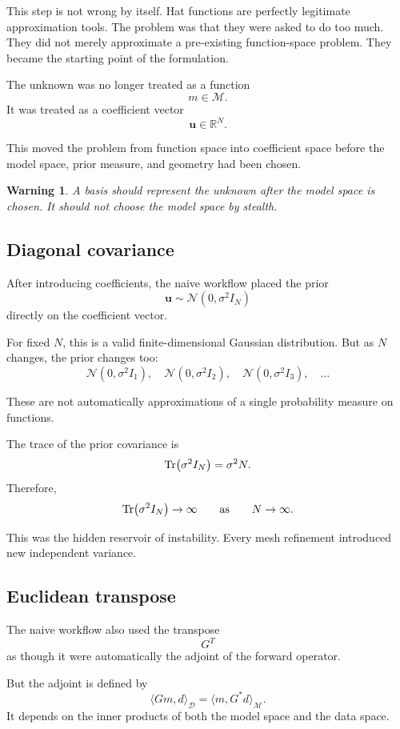 \documentclass[11pt,a4paper]{book}
\newtheorem{warning}[definition]{Warning}
\newcommand{\M}{\mathcal{M}}      %
\newcommand{\D}{\mathcal{D}}      %
\newcommand{\R}{\mathbb{R}}
\newcommand{\G}{G}
\newcommand{\Gadj}{G^\ast}
\begin{document}
This step is not wrong by itself. Hat functions are perfectly legitimate
approximation tools. The problem was that they were asked to do too much. They
did not merely approximate a pre-existing function-space problem. They became
the starting point of the formulation.

The unknown was no longer treated as a function
\[
    m\in\M.
\]
It was treated as a coefficient vector
\[
    \bm{u}\in\R^N.
\]

This moved the problem from function space into coefficient space before the
model space, prior measure, and geometry had been chosen.

\begin{warning}
A basis should represent the unknown after the model space is chosen. It should
not choose the model space by stealth.
\end{warning}

\subsection{Diagonal covariance}

After introducing coefficients, the naive workflow placed the prior
\[
    \bm{u}\sim\mathcal{N}(0,\sigma^2 I_N)
\]
directly on the coefficient vector.

For fixed $N$, this is a valid finite-dimensional Gaussian distribution. But
as $N$ changes, the prior changes too:
\[
    \mathcal{N}(0,\sigma^2 I_1),
    \quad
    \mathcal{N}(0,\sigma^2 I_2),
    \quad
    \mathcal{N}(0,\sigma^2 I_3),
    \quad
    \ldots
\]

These are not automatically approximations of a single probability measure on
functions.

The trace of the prior covariance is
\[
    \Tr(\sigma^2 I_N)
    =
    \sigma^2 N.
\]
Therefore,
\[
    \Tr(\sigma^2 I_N)\to\infty
    \qquad
    \text{as}
    \qquad
    N\to\infty.
\]

This was the hidden reservoir of instability. Every mesh refinement introduced
new independent variance.

\subsection{Euclidean transpose}

The naive workflow also used the transpose
\[
    G^T
\]
as though it were automatically the adjoint of the forward operator.

But the adjoint is defined by
\[
    \langle \G m,d\rangle_{\D}
    =
    \langle m,\Gadj d\rangle_{\M}.
\]
It depends on the inner products of both the model space and the data space.
\end{document}

